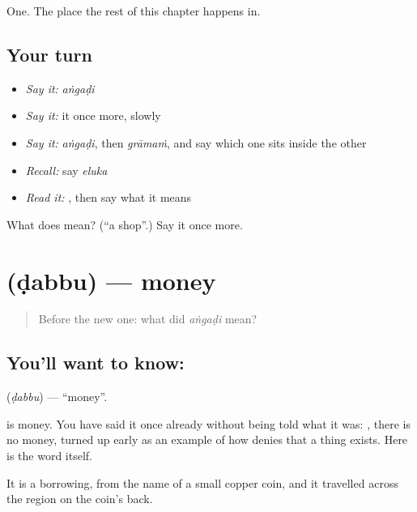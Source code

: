 \begin{grammarlens}[title={What you've built}]
One. The place the rest of this chapter happens in.
\end{grammarlens}

\subsection*{Your turn}
\begin{itemize}
\raggedright
  \item \emph{Say it:} \emph{aṅgaḍi}
  \item \emph{Say it:} it once more, slowly
  \item \emph{Say it:} \emph{aṅgaḍi}, then \emph{grāmaṁ}, and say which one sits inside the other
  \item \emph{Recall:} say \emph{eluka}
  \item \emph{Read it:} \textbf{}, then say what it means
\end{itemize}

\begin{tcolorbox}[breakable,colback=teal!4,colframe=teal!35!black,title={Before you move on}]
What does  mean? (\textquotedblleft{}a shop\textquotedblright{}.) Say it once more.
\end{tcolorbox}
\section[\texorpdfstring{\te{డబ్బు} (ḍabbu)}{డబ్బు (ḍabbu)}]{ (ḍabbu) — money}

\label{lesson:TE-C72-money}



\begin{quote}
Before the new one: what did \emph{aṅgaḍi} mean?
\end{quote}

\subsection*{You'll want to know: }
\textbf{} (\emph{ḍabbu}) — \textquotedblleft{}money\textquotedblright{}.

 is money. You have said it once already without being told what it was:  , there is no money, turned up early as an example of how  denies that a thing exists. Here is the word itself.

It is a borrowing, from the name of a small copper coin, and it travelled across the region on the coin's back.

